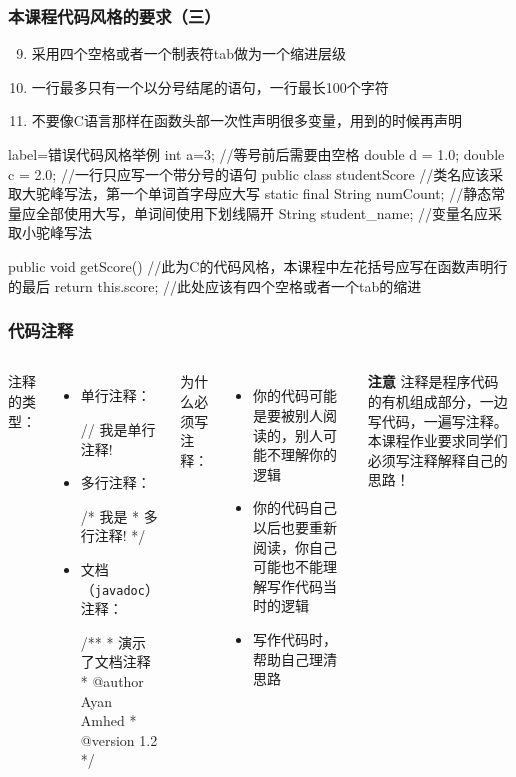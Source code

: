 \begin{frame}[fragile]
  \frametitle{本课程代码风格的要求（三）}
  \begin{enumerate}
    \setcounter{enumi}{8}
    \item 采用四个空格或者一个制表符tab做为一个缩进层级
    \item 一行最多只有一个以分号结尾的语句，一行最长100个字符
    \item 不要像C语言那样在函数头部一次性声明很多变量，用到的时候再声明
  \end{enumerate}
  
  \begin{javacode*}{label=错误代码风格举例}
    int a=3; //等号前后需要由空格
    double d = 1.0; double c = 2.0; //一行只应写一个带分号的语句
    public class studentScore {} //类名应该采取大驼峰写法，第一个单词首字母应大写
    static final String numCount; //静态常量应全部使用大写，单词间使用下划线隔开
    String student_name; //变量名应采取小驼峰写法
    
    public void getScore()
    {//此为C的代码风格，本课程中左花括号应写在函数声明行的最后
    return this.score; //此处应该有四个空格或者一个tab的缩进
    } 
  \end{javacode*}

\end{frame}

\begin{frame}[fragile]
  \frametitle{代码注释}
  \begin{columns}
  注释的类型：
\begin{itemize}
  \item 单行注释：
\begin{javacode}
// 我是单行注释!
\end{javacode}
  \item 多行注释：
\begin{javacode}
/* 我是 
* 多行注释!
*/
\end{javacode}
  \item 文档（\texttt{javadoc}）注释：
\begin{javacode}
/**
* 演示了文档注释
* @author Ayan Amhed
* @version 1.2
*/
\end{javacode}
\end{itemize}
为什么必须写注释：
\begin{itemize}
  \item 你的代码可能是要被别人阅读的，别人可能不理解你的逻辑
  \item 你的代码自己以后也要重新阅读，你自己可能也不能理解写作代码当时的逻辑
  \item 写作代码时，帮助自己理清思路
\end{itemize}
\begin{block}{\textbf{注意}}
  注释是程序代码的有机组成部分，一边写代码，一遍写注释。本课程作业要求同学们必须写注释解释自己的思路！
\end{block}
  \end{columns}
\end{frame}

